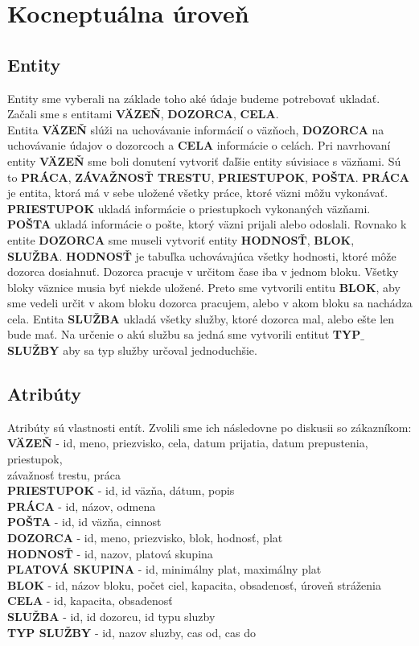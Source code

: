 \documentclass[slovak, 12pt, Times New Roman]{article}
\begin{document}
	\section{Kocneptuálna úroveň}
		\subsection{Entity}
			Entity sme vyberali na základe toho aké údaje budeme potrebovať ukladať. Začali sme s entitami \textbf{VÄZEŇ}, \textbf{DOZORCA}, \textbf{CELA}.\\ Entita \textbf{VÄZEŇ} slúži na uchovávanie informácií o väzňoch, \textbf{DOZORCA} na uchovávanie údajov o dozorcoch a \textbf{CELA} informácie o celách. Pri navrhovaní entity \textbf{VÄZEŇ} sme boli donutení vytvoriť ďaľšie entity súvisiace s väzňami. Sú to \textbf{PRÁCA}, \textbf{ZÁVAŽNOSŤ TRESTU}, \textbf{PRIESTUPOK}, \textbf{POŠTA}. \textbf{PRÁCA} je entita, ktorá má v sebe uložené všetky práce, ktoré väzni môžu vykonávať. \textbf{PRIESTUPOK} ukladá informácie o priestupkoch vykonaných väzňami. \textbf{POŠTA} ukladá informácie o pošte, ktorý väzni prijali alebo odoslali. Rovnako k entite \textbf{DOZORCA} sme museli vytvoriť entity \textbf{HODNOSŤ}, \textbf{BLOK}, \textbf{SLUŽBA}. \textbf{HODNOSŤ} je tabuľka uchovávajúca všetky hodnosti, ktoré môže dozorca dosiahnuť. Dozorca pracuje v určitom čase iba v jednom bloku. Všetky bloky väznice musia byť niekde uložené. Preto sme vytvorili entitu \textbf{BLOK}, aby sme vedeli určit v akom bloku dozorca pracujem, alebo v akom bloku sa nachádza cela. Entita \textbf{SLUŽBA} ukladá všetky služby, ktoré dozorca mal, alebo ešte len bude mať. Na určenie o akú službu sa jedná sme vytvorili entitut \textbf{TYP$\_$SLUŽBY} aby sa typ služby určoval jednoduchšie.
		\subsection{Atribúty}
			Atribúty sú vlastnosti entít. Zvolili sme ich následovne po diskusii so zákazníkom: \\
			\textbf{VÄZEŇ} - id, meno, priezvisko, cela, datum prijatia, datum prepustenia, priestupok, \\ závažnosť trestu, práca\\
			\textbf{PRIESTUPOK} - id, id väzňa, dátum, popis\\
			\textbf{PRÁCA} - id, názov, odmena\\
			\textbf{POŠTA} - id, id väzňa, cinnost\\
			\textbf{DOZORCA} - id, meno, priezvisko, blok, hodnosť, plat \\
			\textbf{HODNOSŤ} - id, nazov, platová skupina\\
			\textbf{PLATOVÁ SKUPINA} - id, minimálny plat, maximálny plat\\
			\textbf{BLOK} - id, názov bloku, počet ciel, kapacita, obsadenosť, úroveň stráženia\\
			\textbf{CELA} - id, kapacita, obsadenosť\\
			\textbf{SLUŽBA} - id, id dozorcu, id typu sluzby\\
			\textbf{TYP SLUŽBY} - id, nazov sluzby, cas od, cas do\\
\end{document}
